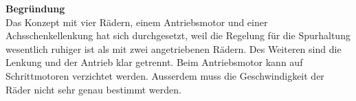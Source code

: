 \newpage
\textbf{Begründung}\\[0.2cm]
Das Konzept mit vier Rädern, einem Antriebsmotor und einer Achsschenkellenkung hat sich durchgesetzt, weil die Regelung für die Spurhaltung wesentlich ruhiger ist als mit zwei angetriebenen Rädern. Des Weiteren sind die Lenkung und der Antrieb klar getrennt. Beim Antriebsmotor kann auf Schrittmotoren verzichtet werden. Ausserdem muss die Geschwindigkeit der Räder nicht sehr genau bestimmt werden.